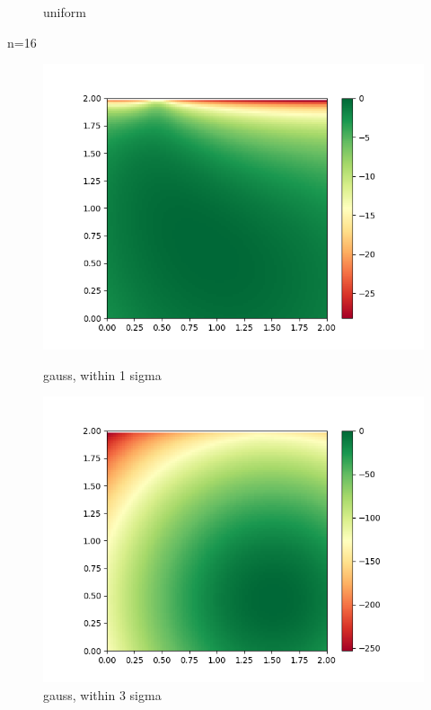 \documentclass[english]{scrartcl}
\begin{document}
\begin{figure}[H]
	\caption{uniform} 
	\endminipage \hfill
\end{figure}

\par n=16
\begin{figure}[H]
	\includegraphics[width=\linewidth]{lighthouse/2d/gauss_1sigma_n=16}
	\caption{gauss, within 1 sigma}  
	\endminipage \hfill
	\includegraphics[width=\linewidth]{lighthouse/2d/gauss_3sigma_n=16}
	\caption{gauss, within 3 sigma} 
	\endminipage \hfill

\end{figure}
\end{document}
